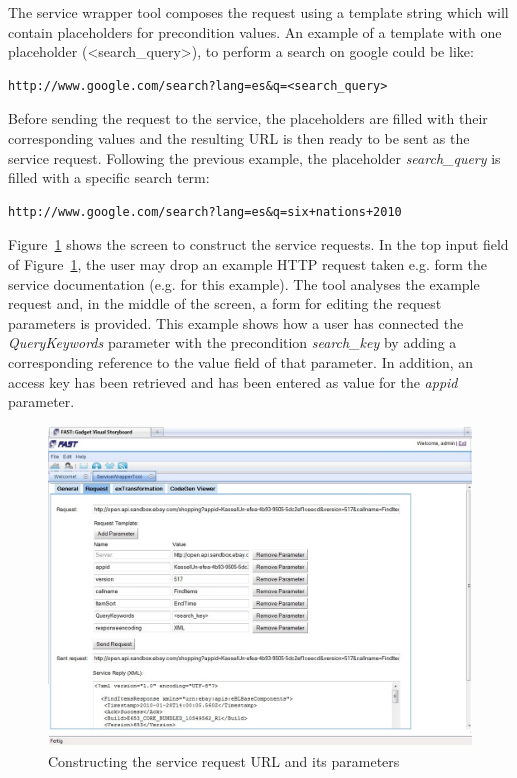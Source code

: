 \documentclass{fast_latex}
\begin{document}
The service wrapper tool composes the request using a template string which will contain placeholders for precondition values. An example of a template with one placeholder (<search\_query>), to perform a search on google could be like:

\begin{verbatim}
http://www.google.com/search?lang=es&q=<search_query>
\end{verbatim}

Before sending the request to the service, the placeholders are filled with their corresponding values and the resulting URL is then ready to be sent as the service request. Following the previous example, the placeholder \emph{search\_query} is filled with a specific search term:

\begin{verbatim}
http://www.google.com/search?lang=es&q=six+nations+2010
\end{verbatim}

Figure~\ref{fig:construct_service_request} shows the screen to construct the service requests. In the top input field of Figure~\ref{fig:construct_service_request}, the user may drop an example HTTP request taken e.g. form the service documentation (e.g. \cite{eBayShoppingAPIs} for this example). The tool analyses the example request and, in the middle of the screen, a form for editing the request parameters is provided. This example shows how a user has connected the \textit{QueryKeywords} parameter with the precondition \textit{search\_key} by adding a corresponding reference to the value field of that parameter. In addition, an access key has been retrieved and has been entered as value for the \textit{appid} parameter.

\begin{figure}[!htb]
  \begin{center}
    \includegraphics[width=\linewidth]{images/ServiceWrapperToolGVSWithRequestExample.jpg}
    \caption{Constructing the service request URL and its parameters}
    \label{fig:construct_service_request}
  \end{center}
\end{figure}
\end{document}
